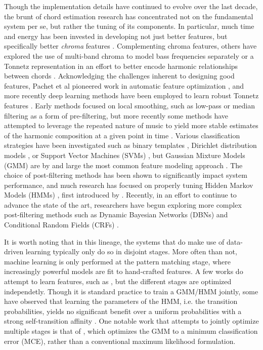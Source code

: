 Though the implementation details have continued to evolve over the last decade, the brunt of chord estimation research has concentrated not on the fundamental system per se, but rather the tuning of its components.
In particular, much time and energy has been invested in developing not just better features, but specifically better \emph{chroma} features \cite{muller2010}.
Complementing chroma features, others have explored the use of multi-band chroma to model bass frequencies separately \cite{Mauch2009?} or a Tonnetz representation in an effort to better encode harmonic relationships between chords \cite{Lee2007}.
Acknowledging the challenges inherent to designing good features, Pachet et al pioneered work in automatic feature optimization \cite{pachet2004}, and more recently deep learning methods have been employed to learn robust Tonnetz features \cite{ejh2011}.
Early methods focused on local smoothing, such as low-pass \cite{} or median \cite{} filtering as a form of pre-filtering, but more recently some methods have attempted to leverage the repeated nature of music to yield more stable estimates of the harmonic composition at a given point in time \cite{Cho2011}.
Various classification strategies have been investigated such as binary templates \cite{?}, Dirichlet distribution models \cite{Burgoyne2008?}, or Support Vector Machines (SVMs) \cite{weller2009}, but Gaussian Mixture Models (GMM) are by and large the most common feature modeling approach \cite{a,b,c}.
The choice of post-filtering methods has been shown to significantly impact system performance, and much research has focused on properly tuning Hidden Markov Models (HMMs) \cite{Cho2010}, first introduced by \cite{sheh2003}.
Recently, in an effort to continue to advance the state of the art, researchers have begun exploring more complex post-filtering methods such as Dynamic Bayesian Networks (DBNs) \cite{mauch2010b, McVicar2013} and Conditional Random Fields (CRFs) \cite{?}.

It is worth noting that in this lineage, the systems that do make use of data-driven learning typically only do so in disjoint stages.
More often than not, machine learning is only performed at the pattern matching stage, where increasingly powerful models are fit to hand-crafted features.
A few works do attempt to learn features, such as \cite{MauchNNLS, Humphrey2012?}, but the different stages are optimized independetly.
Though it is standard practice to train a GMM/HMM jointly, some have observed that learning the parameters of the HMM, i.e. the transition probabilities, yields no significant benefit over a uniform probabilities with a strong self-transition affinity \cite{Cho2014PhD}.
One notable work that attempts to jointly optimize multiple stages is that of \cite{Kim2012}, which optimizes the GMM to a minimum classification error (MCE), rather than a conventional maximum likelihood formulation.


